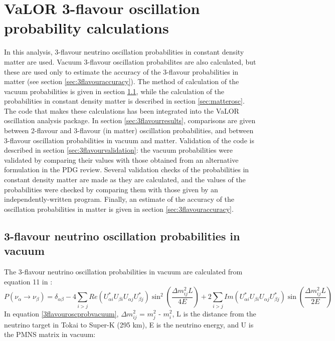 \clearpage

\section{VaLOR 3-flavour oscillation probability calculations}
\label{appendix:valor_3f_osc_prob_code}

In this analysis, 3-flavour neutrino oscillation probabilities in constant density matter are used. Vacuum 3-flavour oscillation 
probabilites are also calculated, but these are used only to estimate the accuracy of the 3-flavour probabilities in matter (see 
section \ref{sec:3flavouraccuracy}). 
The method of calculation of the vacuum probabilities is given in section \ref{sec:vacuumosc}, while the calculation 
of the probabilities in constant density matter is described in section \ref{sec:matterosc}. The code that makes these calculations 
has been integrated into the VaLOR oscillation analysis package. In section \ref{sec:3flavourresults}, 
comparisons are given between 2-flavour and 3-flavour (in matter) oscillation probabilities, and between 3-flavour oscillation probabilities 
in vacuum and matter. Validation of the code is described in section \ref{sec:3flavourvalidation}: the vacuum probabilities were validated 
by comparing their values with those obtained from an alternative formulation in the PDG review. Several validation checks of 
the probabilities in constant density matter are made as they are calculated, and the values of the probabilities were checked 
by comparing them with those given by an independently-written program. Finally, an estimate of the accuracy of the oscillation 
probabilities in matter is given in section \ref{sec:3flavouraccuracy}.
   
\subsection{3-flavour neutrino oscillation probabilities in vacuum}
\label{sec:vacuumosc}

The 3-flavour neutrino oscillation probabilities in vacuum are calculated from equation 11 in \cite{kayser2005}:
\begin{equation}
P(\nu_{\alpha} \rightarrow \nu_{\beta}) = \delta_{\alpha \beta} - 4 \sum_{i>j} Re(U_{\alpha i}^{*} U_{\beta i} U_{\alpha j} U_{\beta j}^{*})
\sin^{2} \left( \frac{\Delta m_{ij}^{2} L}{4E} \right) + 2 \sum_{i>j} Im(U_{\alpha i}^{*} U_{\beta i} U_{\alpha j} U_{\beta j}^{*})
\sin \left(\frac{\Delta m_{ij}^{2} L}{2E} \right)
\label{3flavouroscprobvacuum}
\end{equation}
In equation \ref{3flavouroscprobvacuum}, $\Delta m_{ij}^{2}$ = $m_{j}^{2}$ - $m_{i}^{2}$, L is the distance from the neutrino target 
in Tokai to Super-K (295 km), E is the neutrino energy, and U is the PMNS matrix in vacuum:

